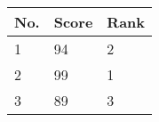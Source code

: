
\begin{table}[h]
	\begin{tabular}{lll}
		No. & Score & Rank \\\hline
		1 & 94 & 2 \\
		2 & 99 & 1 \\
		3 & 89 & 3
	\end{tabular}
\end{table}

